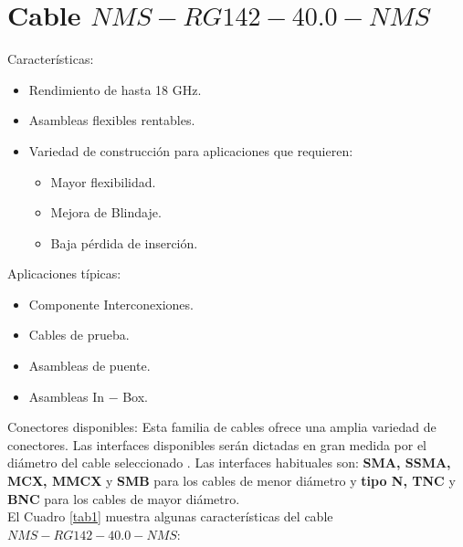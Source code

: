 \documentclass[12pt,graphicx,caption,rotating]{article}
\begin{document}
\section{Cable $NMS−RG142−40.0−NMS$}
\noindent
Características:
\begin{itemize}
 \item Rendimiento de hasta 18 GHz.
 \item Asambleas flexibles rentables.
 \item Variedad de construcción para aplicaciones que requieren:
 \begin{itemize}
  \item Mayor flexibilidad.
  \item Mejora de Blindaje.
  \item Baja pérdida de inserción.
 \end{itemize}
\end{itemize}
\noindent
Aplicaciones típicas:
\begin{itemize}
 \item Componente Interconexiones.
 \item Cables de prueba.
 \item Asambleas de puente.
 \item Asambleas In − Box.
\end{itemize}
\noindent
Conectores disponibles:
Esta familia de cables ofrece una amplia variedad de conectores. Las interfaces disponibles serán dictadas en gran medida por el diámetro del cable seleccionado . Las interfaces habituales son: \textbf{SMA, SSMA, MCX, MMCX} y \textbf{SMB} para los cables de menor diámetro y \textbf{tipo N, TNC} y \textbf{BNC} para los cables de mayor diámetro.\\
El Cuadro \ref{tab1} muestra algunas características del cable $NMS−RG142−40.0−NMS$:
\end{document}
